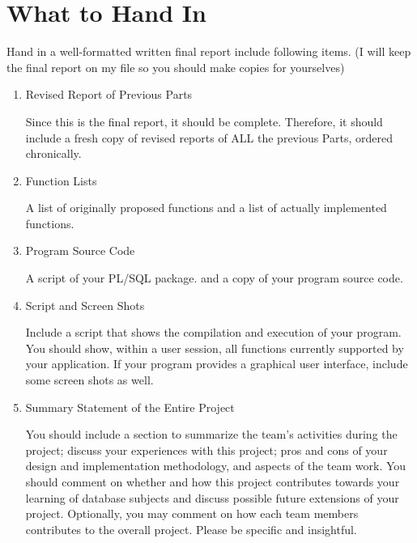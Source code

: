 \documentclass[11pt]{article}
\begin{document}
\section*{What to Hand In}
\label{sec-2}

  
  Hand in a well-formatted written final report include following
  items. (I will keep the final report on my file so you should make
  copies for yourselves)

\begin{enumerate}
\item Revised Report of Previous Parts
     
     Since this is the final report, it should be complete. Therefore,
     it should include a fresh copy of revised reports of ALL the
     previous Parts, ordered chronically.
\item Function Lists
     
     A list of originally proposed functions and a list of actually
     implemented functions.
\item Program Source Code

     A script of your PL/SQL package. and a copy of your program
     source code.
\item Script and Screen Shots
     
     Include a script that shows the compilation and execution of your
     program. You should show, within a user session, all functions
     currently supported by your application. If your program provides
     a graphical user interface, include some screen shots as well.
\item Summary Statement of the Entire Project
     
     You should include a section to summarize the team's activities
     during the project; discuss your experiences with this project;
     pros and cons of your design and implementation methodology, and
     aspects of the team work. You should comment on whether and how
     this project contributes towards your learning of database
     subjects and discuss possible future extensions of your
     project. Optionally, you may comment on how each team members
     contributes to the overall project. Please be specific and
     insightful.
\end{enumerate}
\end{document}
